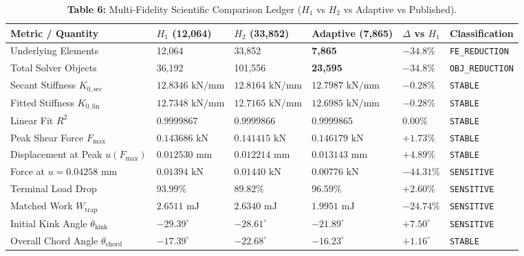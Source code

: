 \documentclass[11pt,a4paper]{article}
\begin{document}
\begin{table}[htbp]
\centering
\small
\caption{\textbf{Table 6:} Multi-Fidelity Scientific Comparison Ledger ($H_1$ vs $H_2$ vs Adaptive vs Published).}
\label{tab:multifidelity}
\begin{tabularx}{\textwidth}{p{3.8cm}p{2.3cm}p{2.3cm}p{2.3cm}p{2.0cm}>{\raggedright\arraybackslash}X}
\toprule
\textbf{Metric / Quantity} & \textbf{$H_1$ (12,064)} & \textbf{$H_2$ (33,852)} & \textbf{Adaptive (7,865)} & \textbf{$\Delta$ vs $H_1$} & \textbf{Classification} \\
\midrule
Underlying Elements & 12,064 & 33,852 & \textbf{7,865} & $-34.8\%$ & \texttt{FE\_REDUCTION} \\
Total Solver Objects & 36,192 & 101,556 & \textbf{23,595} & $-34.8\%$ & \texttt{OBJ\_REDUCTION} \\
Secant Stiffness $K_{0,\mathrm{sec}}$ & $12.8346\text{ kN/mm}$ & $12.8164\text{ kN/mm}$ & \textbf{$12.7987\text{ kN/mm}$} & $-0.28\%$ & \texttt{STABLE} \\
Fitted Stiffness $K_{0,\mathrm{lin}}$ & $12.7348\text{ kN/mm}$ & $12.7165\text{ kN/mm}$ & \textbf{$12.6985\text{ kN/mm}$} & $-0.28\%$ & \texttt{STABLE} \\
Linear Fit $R^2$ & $0.9999867$ & $0.9999866$ & \textbf{$0.9999865$} & $0.00\%$ & \texttt{STABLE} \\
Peak Shear Force $F_{\max}$ & $0.143686\text{ kN}$ & $0.141415\text{ kN}$ & \textbf{$0.146179\text{ kN}$} & $+1.73\%$ & \texttt{STABLE} \\
Displacement at Peak $u(F_{\max})$ & $0.012530\text{ mm}$ & $0.012214\text{ mm}$ & \textbf{$0.013143\text{ mm}$} & $+4.89\%$ & \texttt{STABLE} \\
Force at $u=0.04258\text{ mm}$ & $0.01394\text{ kN}$ & $0.01440\text{ kN}$ & \textbf{$0.00776\text{ kN}$} & $-44.31\%$ & \texttt{SENSITIVE} \\
Terminal Load Drop & $93.99\%$ & $89.82\%$ & \textbf{$96.59\%$} & $+2.60\%$ & \texttt{SENSITIVE} \\
Matched Work $W_{\mathrm{trap}}$ & $2.6511\text{ mJ}$ & $2.6340\text{ mJ}$ & \textbf{$1.9951\text{ mJ}$} & $-24.74\%$ & \texttt{SENSITIVE} \\
Initial Kink Angle $\theta_{\mathrm{kink}}$ & $-29.39^\circ$ & $-28.61^\circ$ & \textbf{$-21.89^\circ$} & $+7.50^\circ$ & \texttt{SENSITIVE} \\
Overall Chord Angle $\theta_{\mathrm{chord}}$ & $-17.39^\circ$ & $-22.68^\circ$ & \textbf{$-16.23^\circ$} & $+1.16^\circ$ & \texttt{STABLE} \\
\bottomrule
\end{tabularx}
\end{table}
\end{document}
